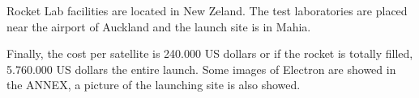 Rocket Lab facilities are located in New Zeland. The test laboratories are placed near the airport of Auckland and the launch site is in Mahia.

Finally, the cost per satellite is 240.000 US dollars or if the rocket is totally filled, 5.760.000 US dollars the entire launch. Some images of Electron are showed in the ANNEX, a picture of the launching site is also showed. 